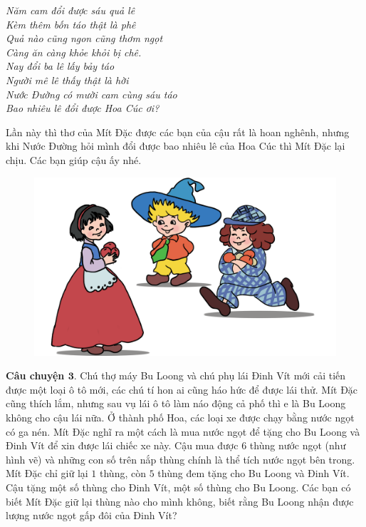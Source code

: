 	\vskip 0.1cm
	\begin{adjustwidth}{90pt}{0pt}
				\begin{flushleft}
					\textit{Năm cam đổi được sáu quả lê\\
			Kèm thêm bốn táo thật là phê\\
			Quả nào cũng ngon cũng thơm ngọt\\
			Càng ăn càng khỏe khỏi bị chê.\\
			Nay đổi ba lê lấy bảy táo\\
			Người mê lê thấy thật là hời\\
			Nước Đường có mười cam cùng sáu táo\\
			Bao nhiêu lê đổi được Hoa Cúc ơi?}
				\end{flushleft}
	\end{adjustwidth}
	\vskip 0.1cm
	Lần này thì thơ của Mít Đặc được các bạn của cậu rất là hoan nghênh, nhưng khi Nước Đường hỏi mình đổi được bao nhiêu lê của Hoa Cúc thì Mít Đặc lại chịu. Các bạn giúp cậu ấy nhé.
	\begin{figure}[H]
		\centering
		\vspace*{-5pt}
		\captionsetup{labelformat= empty, justification=centering}
		\includegraphics[width=0.6\linewidth]{Hinh4_TaoLe}
		\vspace*{-10pt}
	\end{figure}
	\textbf{\color{toancuabi}Câu chuyện $\pmb{3.}$} Chú thợ máy Bu Loong và chú phụ lái Đinh Vít mới cải tiến được một loại ô tô mới, các chú tí hon ai cũng háo hức để được lái thử. Mít Đặc cũng thích lắm, nhưng sau vụ lái ô tô làm náo động cả phố thì e là Bu Loong không cho cậu lái nữa. Ở thành phố Hoa, các loại xe được chạy bằng nước ngọt có ga nén. Mít Đặc nghĩ ra một cách là mua nước ngọt để tặng cho Bu Loong và Đinh Vít để xin được lái chiếc xe này. Cậu mua được $6$ thùng nước ngọt (như hình vẽ) và những con số trên nắp thùng chính là thể tích nước ngọt bên trong. Mít Đặc chỉ giữ lại $1$ thùng, còn $5$ thùng đem tặng cho Bu Loong và Đinh Vít. Cậu tặng một số thùng cho Đinh Vít, một số thùng cho Bu Loong. Các bạn có biết Mít Đặc giữ lại thùng nào cho mình không, biết rằng Bu Loong nhận được lượng nước ngọt gấp đôi của Đinh Vít?
